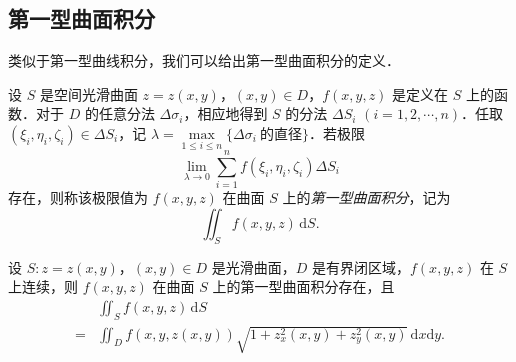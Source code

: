 \begin{figure}[htbp]
\centering
{}\caption{\relax}\label{fig:21-2}
\end{figure}

\subsection{第一型曲面积分}

类似于第一型曲线积分，我们可以给出第一型曲面积分的定义．

\begin{definition}\label{def:21-2}
设 $S$ 是空间光滑曲面 $z=z(x,y)$，$(x,y)\in D$，$f(x,y,z)$ 是定义在 $S$ 上的函数．对于 $D$ 的任意分法 $\Delta\sigma_{i}$，相应地得到 $S$ 的分法 $\Delta S_{i}$ $(i=1,2,\cdots,n)$．任取 $(\xi_{i},\eta_{i},\zeta_{i})\in\Delta S_{i}$，记 $\lambda=\max\limits_{1\leqslant i\leqslant n}\{\Delta\sigma_{i}\ \text{的直径}\}$．若极限
\[
\lim_{\lambda\to0}\sum_{i=1}^{n}f(\xi_{i},\eta_{i},\zeta_{i})\Delta S_{i}
\]
存在，则称该极限值为 $f(x,y,z)$ 在曲面 $S$ 上的\emph{第一型曲面积分}，记为
\[
\iint_{S}f(x,y,z)\,\mathrm{d}S.
\]
\end{definition}

\begin{theorem}\label{thm:21-2}
设 $S:z=z(x,y)$，$(x,y)\in D$ 是光滑曲面，$D$ 是有界闭区域，$f(x,y,z)$ 在 $S$ 上连续，则 $f(x,y,z)$ 在曲面 $S$ 上的第一型曲面积分存在，且
\[
\begin{aligned}
&\iint_{S}f(x,y,z)\,\mathrm{d}S\\
={}&\iint_{D}f(x,y,z(x,y))\sqrt{1+z_{x}^{2}(x,y)+z_{y}^{2}(x,y)}\,\mathrm{d}x\mathrm{d}y.
\end{aligned}
\]
\end{theorem}


